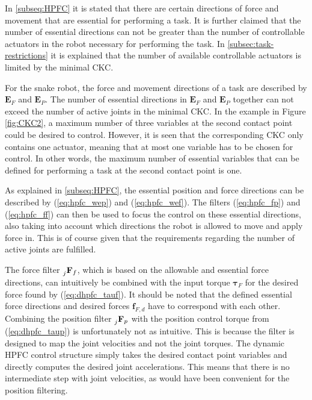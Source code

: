 In \ref{subseq:HPFC} it is stated that there are certain directions of force and movement that are essential for performing a task. It is further claimed that the number of essential directions can not be greater than the number of controllable actuators in the robot necessary for performing the task. In \ref{subsec:task-restrictions} it is explained that the number of available controllable actuators is limited by the minimal CKC.

For the snake robot, the force and movement directions of a task are described by $\mathbf{E}_F$ and $\mathbf{E}_P$.
The number of essential directions in $\mathbf{E}_F$ and $\mathbf{E}_P$ together can not exceed the number of active joints in the minimal CKC. In the example in Figure \ref{fig:CKC2}, a maximum number of three variables at the second contact point could be desired to control. However, it is seen that the corresponding CKC only contains one actuator, meaning that at most one variable has to be chosen for control. In other words, the maximum number of essential variables that can be defined for performing a task at the second contact point is one.

As explained in \ref{subseq:HPFC}, the essential position and force directions can be described by (\ref{eq:hpfc_wep}) and (\ref{eq:hpfc_wef}). The filters (\ref{eq:hpfc_fp}) and (\ref{eq:hpfc_ff}) can then be used to focus the control on these essential directions, also taking into account which directions the robot is allowed to move and apply force in. This is of course given that the requirements regarding the number of active joints are fulfilled.

The force filter $\prescript{}{j}{\mathbf{F}}_{f}$, which is based on the allowable and essential force directions, can intuitively be combined with the input torque $\boldsymbol{\tau}_F$ for the desired force found by (\ref{eq:dhpfc_tauf}). It should be noted that the defined essential force directions and desired forces $\mathbf{f}_{F,d}$ have to correspond with each other. Combining the position filter $\prescript{}{j}{\mathbf{F}}_{p}$ with the position control torque from (\ref{eq:dhpfc_taup}) is unfortunately not as intuitive. This is because the filter is designed to map the joint velocities and not the joint torques. The dynamic HPFC control structure simply takes the desired contact point variables and directly computes the desired joint accelerations. This means that there is no intermediate step with joint velocities, as would have been convenient for the position filtering.

